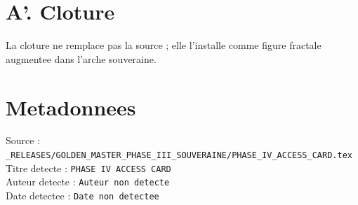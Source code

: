 \documentclass[11pt,a4paper]{article}
\begin{document}
\section*{A'. Cloture}
La cloture ne remplace pas la source ; elle l'installe comme figure fractale augmentee dans l'arche souveraine.

\section*{Metadonnees}
Source : \texttt{_RELEASES/GOLDEN_MASTER_PHASE_III_SOUVERAINE/PHASE_IV_ACCESS_CARD.tex}\\
Titre detecte : \texttt{PHASE IV ACCESS CARD}\\
Auteur detecte : \texttt{Auteur non detecte}\\
Date detectee : \texttt{Date non detectee}
\end{document}
